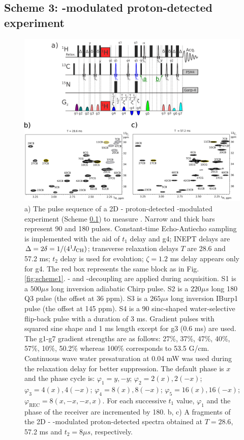 \documentclass[twocolumn]{svjour3}           %
\begin{document}
\subsection{Scheme 3: \oneJch-modulated proton-detected experiment}
\label{subseq:scheme3}

\begin{figure}
  \includegraphics[width=1.0\textwidth]{Fig3_maxZQ}
  \caption{
    a) The pulse sequence of a 2D \hlab-\clab{} proton-detected 
    \oneJch-modulated experiment (Scheme \ref{subseq:scheme3}) 
    to measure \gtwoCH. Narrow and thick bars represent 90\degree{} 
    and 180\degree{} pulses. Constant-time \clab{} Echo-Antiecho 
    sampling is implemented with the aid of $t_1$ delay and g4; 
    INEPT delays are $\Delta = 2\delta = 1/(4 ^1\!J_\text{CH})$; 
    transverse relaxation delays $T$ are 28.6 and 57.2 ms; 
    $t_2$ delay is used for \oneJch{} evolution; $\zeta = 1.2$ ms 
    delay appears only for g4. The red box represents the same block 
    as in Fig. \ref{fig:scheme1}. \nlab- and \clab-decoupling are applied 
    during acquisition. 
    S1 is a $500 \mu s$ long \clab{} inversion adiabatic Chirp pulse. 
    S2 is a $220 \mu s$ long 180\degree{} Q3 pulse (the offset at 36 ppm). 
    S3 is a $265 \mu s$ long inversion IBurp1 pulse (the offset at 145 ppm).
    S4 is a 90\degree{} sinc-shaped water-selective \hlab{} flip-back pulse with a duration of 3 ms.
    Gradient pulses with squared sine shape and 1 ms length except for g3 
    (0.6 ms) are used. The g1-g7 gradient strengths are as follows: 
    27\%, 37\%, 47\%, 40\%, 57\%, 10\%, 50.2\% whereas 100\% corresponds to 53.5 G/cm. Continuous wave water presaturation at 0.04 mW was used during the relaxation delay for better suppression.
    The default phase is $x$ and the phase cycle is: 
    $\varphi_1 = y, -y$; 
    $\varphi_2 = 2(x), 2(-x)$; 
    $\varphi_3 = 4(x), 4(-x)$; 
    $\varphi_4 = 8(x), 8(-x)$; 
    $\varphi_5 = 16(x), 16(-x)$; 
    $\varphi_\text{REC} = 8(x, -x, -x, x)$. 
    For each successive $t_1$ value, $\varphi_1$ and the phase of the receiver 
    are incremented by 180\degree. 
    b, c) A fragments of the 2D \hlab-\clab{} \oneJch-modulated proton-detected spectra obtained at $T = 28.6$, 57.2 ms and $t_2 = 8 \mu s$, 
    respectively.
  }
  \label{fig:scheme3}
\end{figure}
\end{document}
